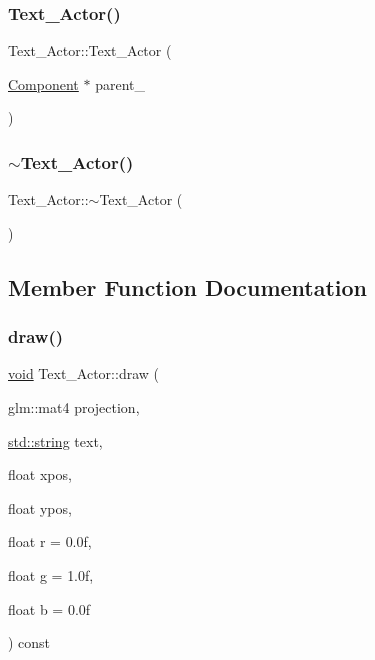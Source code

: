 \subsubsection{\texorpdfstring{Text\+\_\+\+Actor()}{Text\_Actor()}}
{\footnotesize\ttfamily Text\+\_\+\+Actor\+::\+Text\+\_\+\+Actor (\begin{DoxyParamCaption}\item[{\hyperlink{classComponent}{Component} $\ast$}]{parent\+\_\+ }\end{DoxyParamCaption})}

\mbox{\label{classText__Actor_af327288b1330371a17070fb499f8d54c}} 
\subsubsection{\texorpdfstring{$\sim$\+Text\+\_\+\+Actor()}{~Text\_Actor()}}
{\footnotesize\ttfamily Text\+\_\+\+Actor\+::$\sim$\+Text\+\_\+\+Actor (\begin{DoxyParamCaption}{ }\end{DoxyParamCaption})}



\subsection{Member Function Documentation}
\mbox{\label{classText__Actor_a7d39e279f8491521f213a8f3dc5309a9}} 
\subsubsection{\texorpdfstring{draw()}{draw()}}
{\footnotesize\ttfamily \hyperlink{imgui__impl__opengl3__loader_8h_ac668e7cffd9e2e9cfee428b9b2f34fa7}{void} Text\+\_\+\+Actor\+::draw (\begin{DoxyParamCaption}\item[{glm\+::mat4}]{projection,  }\item[{\hyperlink{imgui__impl__opengl3__loader_8h_ac83513893df92266f79a515488701770}{std\+::string}}]{text,  }\item[{float}]{xpos,  }\item[{float}]{ypos,  }\item[{float}]{r = {\ttfamily 0.0f},  }\item[{float}]{g = {\ttfamily 1.0f},  }\item[{float}]{b = {\ttfamily 0.0f} }\end{DoxyParamCaption}) const}

